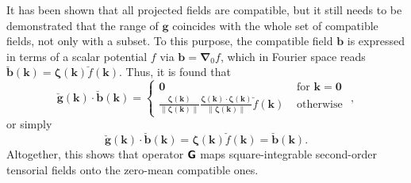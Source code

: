 It has been shown that all projected fields are compatible, but it still needs to be demonstrated that the range of \(\bm g\) coincides with the whole set of compatible fields, not only with a subset.
To this purpose, the compatible field \(\bm{b}\) is expressed in terms of a scalar potential \(f\) via \(\bm{b}=\bm{\nabla}_{0} f\), which in Fourier space reads \(\breve{\bm{b}}(\bm{k})=\bm{\zeta}(\bm{k}) \breve{f}(\bm{k})\).
Thus, it is found that
\begin{equation}
\breve{\bm g}(\bm{k}) \cdot \breve{\bm{b}}(\bm{k})=\left\{\begin{array}{ll}
\bm{0} & \text { for } \bm{k}=\bm{0} \\[5pt]
\displaystyle{\frac{\bm{\zeta}(\bm{k})}{\|\bm{\zeta}(\bm{k})\|} \frac{\bm{\zeta}(\bm{k}) \cdot \bm{\zeta}(\bm{k})}{\|\bm{\zeta}(\bm{k})\|} \breve{f}(\bm{k}) }& \text { otherwise }
\end{array}\right.,
\end{equation}
or simply
\begin{equation}
\breve{\boldsymbol{g}}(\bm{k}) \cdot \breve{\bm{b}}(\bm{k})=\bm{\zeta}(\bm{k}) \breve{f}(\bm{k})=\breve{\bm{b}}(\bm{k}).
\end{equation}
Altogether, this shows that operator \(\boldsymbol{\mathsf{G}}\) maps square-integrable second-order tensorial fields onto the zero-mean compatible ones.

